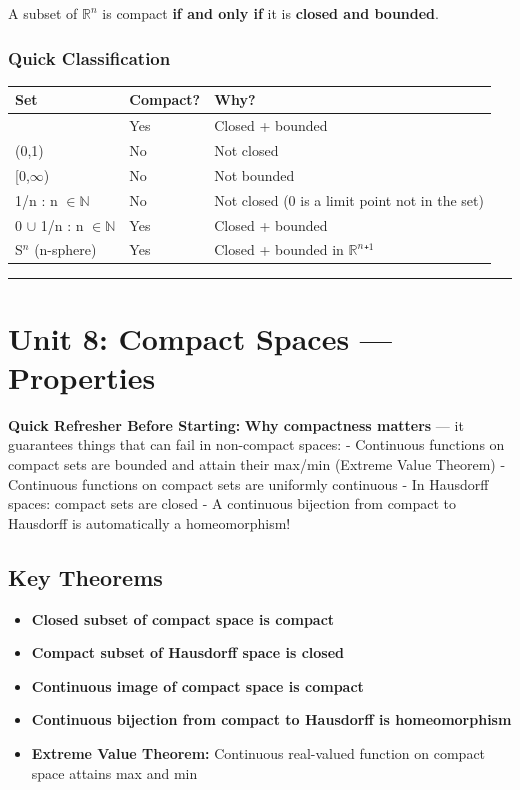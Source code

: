 \documentclass[12pt,a4paper,openany]{book}
\begin{document}
{{A subset of $\mathbb{R}^n$ is compact \textbf{if and only if} it is \textbf{closed and bounded}.

\subsubsection{Quick Classification}
\begin{center}
\begin{tabular}{|l|l|l|}
\hline
\textbf{Set} & \textbf{Compact?} & \textbf{Why?} \\
\hline
[0,1] & Yes & Closed + bounded \\
\hline
(0,1) & No & Not closed \\
\hline
[0,$\infty$) & No & Not bounded \\
\hline
{1/n : n $\in\mathbb{N}$} & No & Not closed (0 is a limit point not in the set) \\
\hline
{0} $\cup$ {1/n : n $\in\mathbb{N}$} & Yes & Closed + bounded \\
\hline
S$^n$ (n-sphere) & Yes & Closed + bounded in $\mathbb{R}^n$⁺$^1$ \\
\hline
\end{tabular}
\end{center}

\bigskip\noindent\rule{\textwidth}{0.4pt}\bigskip

\section{Unit 8: Compact Spaces — Properties }

\begin{prereqbox}
 \textbf{Quick Refresher Before Starting:}
\textbf{Why compactness matters} — it guarantees things that can fail in non-compact spaces:
- Continuous functions on compact sets are bounded and attain their max/min (Extreme Value Theorem)
- Continuous functions on compact sets are uniformly continuous
- In Hausdorff spaces: compact sets are closed
- A continuous bijection from compact to Hausdorff is automatically a homeomorphism!
\end{prereqbox}


\subsection{Key Theorems}

\begin{itemize}
  \item \textbf{Closed subset of compact space is compact}
  \item \textbf{Compact subset of Hausdorff space is closed}
  \item \textbf{Continuous image of compact space is compact}
  \item \textbf{Continuous bijection from compact to Hausdorff is homeomorphism}
  \item \textbf{Extreme Value Theorem:} Continuous real-valued function on compact space attains max and min
\end{itemize}

}}
\end{document}
